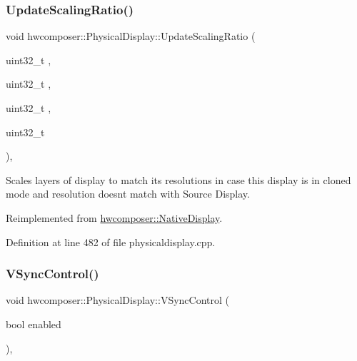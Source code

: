 \subsubsection{\texorpdfstring{Update\+Scaling\+Ratio()}{UpdateScalingRatio()}}
{\footnotesize\ttfamily void hwcomposer\+::\+Physical\+Display\+::\+Update\+Scaling\+Ratio (\begin{DoxyParamCaption}\item[{uint32\+\_\+t}]{,  }\item[{uint32\+\_\+t}]{,  }\item[{uint32\+\_\+t}]{,  }\item[{uint32\+\_\+t}]{ }\end{DoxyParamCaption})\hspace{0.3cm}{\ttfamily [override]}, {\ttfamily [virtual]}}

Scales layers of display to match it\textquotesingle{}s resolutions in case this display is in cloned mode and resolution doesn\textquotesingle{}t match with Source Display. 

Reimplemented from \mbox{\hyperlink{classhwcomposer_1_1NativeDisplay_abfad592c2a5e956760c194fa7831171c}{hwcomposer\+::\+Native\+Display}}.



Definition at line 482 of file physicaldisplay.\+cpp.


\begin{DoxyCode}{0}
\end{DoxyCode}
\mbox{\label{classhwcomposer_1_1PhysicalDisplay_a058a5c3a853da43fb76b129cc4e24ef8}} 
\subsubsection{\texorpdfstring{V\+Sync\+Control()}{VSyncControl()}}
{\footnotesize\ttfamily void hwcomposer\+::\+Physical\+Display\+::\+V\+Sync\+Control (\begin{DoxyParamCaption}\item[{bool}]{enabled }\end{DoxyParamCaption})\hspace{0.3cm}{\ttfamily [override]}, {\ttfamily [virtual]}}



